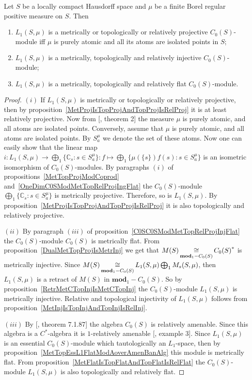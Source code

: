 \begin{proposition}\label{L1C0SModMetTopRelProjInjFlat} Let $S$ be a locally
compact Hausdorff space and $\mu$ be a finite Borel regular positive measure on
$S$. Then 

\begin{enumerate}[label = (\roman*)]
    \item $L_1(S,\mu)$ is a metrically or topologically or relatively projective 
    $C_0(S)$-module iff $\mu$ is purely atomic and all its atoms are 
    isolated points in $S$;

    \item $L_1(S,\mu)$ is a metrically, topologically and relatively injective 
    $C_0(S)$-module;

    \item $L_1(S,\mu)$ is a metrically, topologically and relatively flat
    $C_0(S)$-module.
\end{enumerate}
\end{proposition}
\begin{proof} $(i)$ If $L_1(S,\mu)$ is metrically or topologically or relatively
projective, then by proposition~\ref{MetProjIsTopProjAndTopProjIsRelProj} it is
at least relatively projective. Now from [\cite{NemRelProjModLp}, theorem 2] 
the measure $\mu$ is purely atomic, and all atoms are isolated  points.
Conversely, assume that $\mu$ is purely atomic, and all atoms are isolated
points. By $S_a^{\mu}$ we denote the set of these atoms. Now one can easily show
that the linear map 
$i:L_1(S,\mu)\to\bigoplus_1 \{\mathbb{C}_s:s\in S_a^{\mu} \}
:f\mapsto \bigoplus_1 \{\mu( \{s \})f(s):s\in S_a^{\mu} \}$ is an isometric
isomorphism of $C_0(S)$-modules. By paragraphs $(i)$ of
propositions~\ref{MetTopProjModCoprod}
and~\ref{OneDimC0SModMetTopRelProjIngFlat} the $C_0(S)$-module $\bigoplus_1
\{\mathbb{C}_s:s\in S_a^{\mu} \}$ is metrically projective. Therefore, so is
$L_1(S,\mu)$. By proposition~\ref{MetProjIsTopProjAndTopProjIsRelProj} it is
also topologically and relatively projective.

$(ii)$ By paragraph $(iii)$ of proposition~\ref{C0SC0SModMetTopRelProjInjFlat} 
the $C_0(S)$-module $C_0(S)$ is metrically flat. From
proposition~\ref{DualMetTopProjIsMetrInj} we get that
$M(S)\mathop{\mathbin{\cong}}\limits_{\mathbf{mod}_1-C_0(S)}{C_0(S)}^*$ is metrically injective. Since
$M(S)\mathop{\mathbin{\cong}}\limits_{\mathbf{mod}_1-C_0(S)}L_1(S,\mu)\bigoplus_1 M_s(S,\mu)$, then
$L_1(S,\mu)$ is a retract of $M(S)$ in $\mathbf{mod}_1-C_0(S)$. So by
proposition~\ref{RetrMetCTopInjIsMetCTopInj} the $C_0(S)$-module $L_1(S,\mu)$ is
metrically injective. Relative and topological injectivity of $L_1(S,\mu)$
follows from proposition~\ref{MetInjIsTopInjAndTopInjIsRelInj}.

$(iii)$ By [\cite{HelBanLocConvAlg}, theorem 7.1.87] the algebra $C_0(S)$ is
relatively amenable. Since this algebra is a $C^*$-algebra it is $1$-relatively 
amenable [\cite{RundeAmenConstFour}, example 3]. Since $L_1(S,\mu)$ is 
an essential $C_0(S)$-module which tautologically an $L_1$-space, then by
proposition~\ref{MetTopEssL1FlatModAoverAmenBanAlg} this module is metrically
flat. From proposition~\ref{MetFlatIsTopFlatAndTopFlatIsRelFlat} the
$C_0(S)$-module $L_1(S,\mu)$ is also topologically and relatively flat.
\end{proof}

